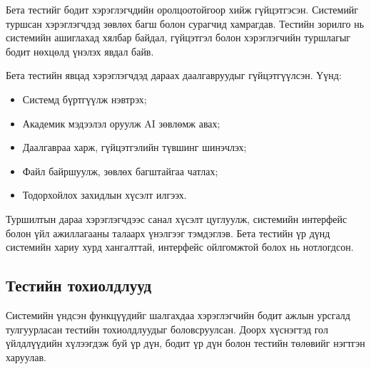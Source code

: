 Бета тестийг бодит хэрэглэгчдийн оролцоотойгоор хийж гүйцэтгэсэн.
Системийг туршсан хэрэглэгчдэд зөвлөх багш болон сурагчид хамрагдав.
Тестийн зорилго нь системийн ашиглахад хялбар байдал, гүйцэтгэл болон
хэрэглэгчийн туршлагыг бодит нөхцөлд үнэлэх явдал байв.

Бета тестийн явцад хэрэглэгчдэд дараах даалгавруудыг гүйцэтгүүлсэн. Үүнд:

\begin{itemize}
    \item Системд бүртгүүлж нэвтрэх;
    \item Академик мэдээлэл оруулж AI зөвлөмж авах;
    \item Даалгавраа харж, гүйцэтгэлийн түвшинг шинэчлэх;
    \item Файл байршуулж, зөвлөх багштайгаа чатлах;
    \item Тодорхойлох захидлын хүсэлт илгээх.
\end{itemize}

Туршилтын дараа хэрэглэгчдээс санал хүсэлт цуглуулж, системийн
интерфейс болон үйл ажиллагааны талаарх үнэлгээг тэмдэглэв.
Бета тестийн үр дүнд системийн хариу хурд хангалттай, интерфейс
ойлгомжтой болох нь нотлогдсон.

\subsection*{Тестийн тохиолдлууд}

Системийн үндсэн функцүүдийг шалгахдаа хэрэглэгчийн бодит ажлын урсгалд
тулгуурласан тестийн тохиолдлуудыг боловсруулсан. Доорх хүснэгтэд гол
үйлдлүүдийн хүлээгдэж буй үр дүн, бодит үр дүн болон тестийн төлөвийг
нэгтгэн харуулав.

